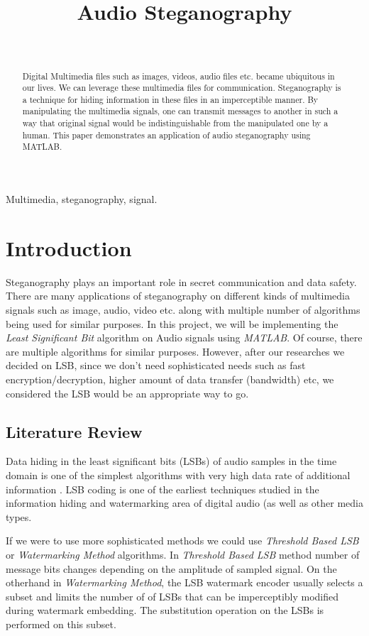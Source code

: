 \documentclass[twocolumns]{IEEEtran}
\author{
	\IEEEauthorblockN{Erdal Sidal Dogan, Mert Komurcuoglu, Berkay Kurkcu} \\
	\IEEEauthorblockA{Facult of Engineering, MEF University \\
		Electrical \& Electronics Engineering Department}
}
\title{Audio Steganography}
\begin{document}
	\maketitle
	\begin{abstract}
		Digital Multimedia files such as images, videos, audio files etc. became ubiquitous in our lives. We can leverage these multimedia files for communication. Steganography is a technique for hiding information in these files in an imperceptible manner. By manipulating the multimedia signals, one can transmit messages to another in such a way that original signal would be indistinguishable from the manipulated one by a human. This paper demonstrates an application of audio steganography using MATLAB.
	\end{abstract}
	\begin{IEEEkeywords}
		Multimedia, steganography, signal.
	\end{IEEEkeywords}
	\section{Introduction}
	Steganography plays an important role in secret communication and data safety. There are many applications of steganography on different kinds of multimedia signals such as image, audio, video etc. along with multiple number of algorithms being used for similar purposes. In this project, we will be implementing the \textit{Least Significant Bit} algorithm on Audio signals using \textit{MATLAB}. Of course, there are multiple algorithms for similar purposes. However, after our researches we decided on LSB, since we don't need sophisticated needs such as fast encryption/decryption, higher amount of data transfer (bandwidth) etc, we considered the LSB would be an appropriate way to go. 
	
	
	\subsection{Literature Review}
	Data hiding in the least significant bits (LSBs) of
	audio samples in the time domain is one of the simplest
	algorithms with very high data rate of additional
	information . LSB coding  is one of the earliest
	techniques studied in the information hiding and
	watermarking area of digital audio (as well as other media
	types.  
	
	If we were to use more sophisticated methods we could use \textit{Threshold Based LSB} or \textit{Watermarking Method} algorithms. In \textit{Threshold Based LSB} method number of message bits changes depending on the amplitude of sampled signal\cite{threshold}. On the otherhand in \textit{Watermarking Method}, the LSB watermark encoder usually selects a subset and limits the number of of LSBs that can be imperceptibly modified during watermark embedding. The substitution operation on the LSBs is performed on this subset\cite{1286709}.
	
\end{document}
